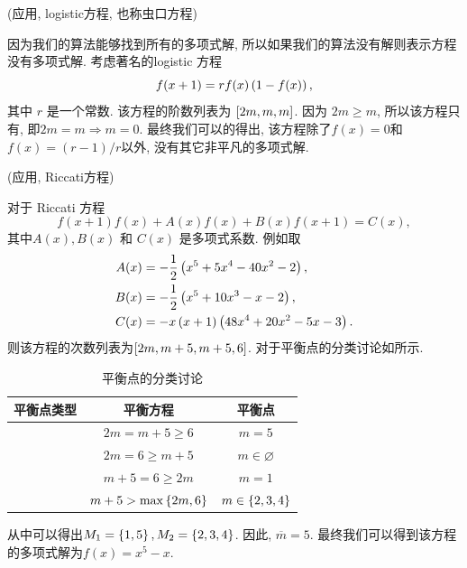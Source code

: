\begin{example}
(应用, logistic方程, 也称虫口方程)

因为我们的算法能够找到所有的多项式解, 所以如果我们的算法没有解则表示方程没有多项式解. 考虑著名的logistic 方程\citep{may1976simple}
\begin{equation}
    f(x+1)=r f(x)\left(1-f(x)\right),
\end{equation}
其中 $r$ 是一个常数. 该方程的阶数列表为 $\left[2m,m,m\right]$. 因为 $2m\ge m$, 所以该方程只有\BPone{}, 即$2m=m\Rightarrow m=0$. 最终我们可以的得出, 该方程除了$f(x)=0$和$f(x)=(r-1)/r$以外, 没有其它非平凡的多项式解.
\end{example}

\begin{example}
(应用, Riccati方程)

对于 Riccati 方程\citep{bittanti2012riccati}
\begin{equation}
    f(x+1)f(x)+A(x)f(x)+B(x)f(x+1)=C(x), \label{raeq}
\end{equation} 
其中$A(x),B(x)$ 和 $C(x)$ 是多项式系数. 例如取
\begin{equation}
\begin{split}
A(x)&= -\frac{1}{2}\left(x^5+5x^4-40x^2-2\right), \\ 
B(x)&= -\frac{1}{2}\left(x^5+10x^3-x-2\right), \\ 
C(x)&= -x\left(x+1\right)\left(48x^4+20x^2-5x-3\right).
\end{split}
\end{equation}
则该方程的次数列表为$\left[2m,m+5,m+5,6\right]$. 对于平衡点的分类讨论如所示.

\begin{table}[H]
\centering
\caption{平衡点的分类讨论}\label{tb}
\begin{tabular}{ccc}
\hline
平衡点类型 & 平衡方程 & 平衡点  \\ 
\hline
\BPone{}  & $2m=m+5\ge 6$            & $m=5$             \\ 
\BPone{}  & $2m=6\ge m+5$            & $m\in \varnothing$             \\ 
\BPone{}  & $m+5=6\ge 2m$            & $m=1$             \\ 
\BPtwo{}  & $m+5>\max\left\{2m,6\right\}$  & $m\in \left\{2,3,4\right\}$ \\
\hline
\end{tabular}
\end{table}
从中可以得出$M_1=\left\{1,5\right\},M_2=\left\{2,3,4\right\}$. 因此, $\overline m=5$. 最终我们可以得到该方程的多项式解为$f(x)=x^5-x$. 


\end{example}
